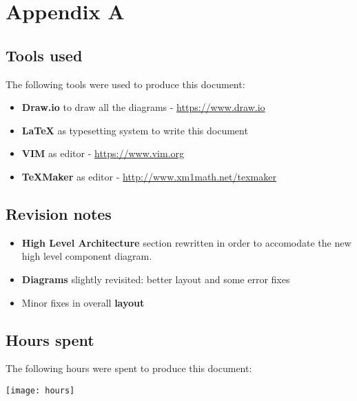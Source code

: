 \newpage
\section*{Appendix A}

\subsection*{Tools used}
The following tools were used to produce this document:
\begin{itemize}
    \item \textbf{Draw.io} to draw all the diagrams - \url{https://www.draw.io}
    \item \textbf{LaTeX} as typesetting system to write this document
    \item \textbf{VIM} as editor - \url{https://www.vim.org}
    \item \textbf{TeXMaker} as editor - \url{http://www.xm1math.net/texmaker}
\end{itemize}

\subsection*{Revision notes}
\begin{itemize}
    \item \textbf{High Level Architecture} section rewritten in order to accomodate the new high level component diagram.
    \item \textbf{Diagrams} slightly revisited: better layout and some error fixes
    \item Minor fixes in overall \textbf{layout}
    
\end{itemize}

\subsection*{Hours spent}
The following hours were spent to produce this document:

\texttt{[image: hours]}